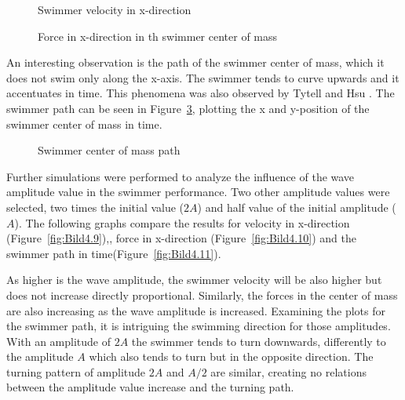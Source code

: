 \begin{figure}[H]
\centering
  \begin{footnotesize}
  
  \caption[Swimmer velocity in x-direction]{Swimmer velocity in x-direction}
   \label{fig:Bild4.6}
  \end{footnotesize}
\end{figure} 


\begin{figure}[H]
\centering
  \begin{footnotesize}
  
  \caption[Force in x-direction in th swimmer center of mass]{Force in x-direction in th swimmer center of mass}
   \label{fig:Bild4.7}
  \end{footnotesize}
\end{figure} 


An interesting observation is the path of the swimmer center of mass, which it does not swim only along the x-axis. The swimmer tends to curve upwards and it accentuates in time.
This phenomena was also observed by Tytell and Hsu \cite{tytell_interactions_2010}. The swimmer path can be seen in Figure~\ref{fig:Bild4.8}, plotting the x and y-position of the
swimmer center of mass in time.


\begin{figure}[H]
\centering
  \begin{footnotesize}
  
  \caption[Swimmer center of mass path]{Swimmer center of mass path}
   \label{fig:Bild4.8}
  \end{footnotesize}
\end{figure} 


Further simulations were performed to analyze the influence of the wave amplitude value in the swimmer performance. Two other amplitude values were selected, two times the initial value
($2A$) and  half value of the initial amplitude ($A$). The following graphs compare the results for velocity in x-direction (Figure~\ref{fig:Bild4.9}),, force in x-direction
(Figure~\ref{fig:Bild4.10}) and the swimmer path in time(Figure~\ref{fig:Bild4.11}). \par
As higher is the wave amplitude, the swimmer velocity will be also higher but does not increase directly proportional. Similarly, the forces in the center of mass are also increasing
as the wave amplitude is increased. Examining the plots for the swimmer path, it is intriguing the swimming direction for those amplitudes. With an amplitude of $2A$ the swimmer
tends to turn downwards, differently to the amplitude $A$ which also tends to turn but in the opposite direction. The turning pattern of amplitude $2A$ and $A/2$ are similar, 
creating no relations between the amplitude value increase and the turning path.


